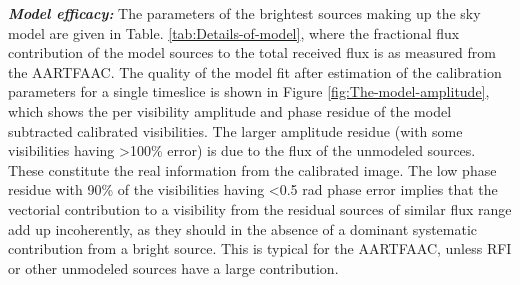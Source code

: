\documentclass{aa}
\begin{document}
\textbf{\emph{Model efficacy:  }}The parameters of the  brightest sources making
up  the sky  model are  given  in Table.  \ref{tab:Details-of-model}, where  the
fractional flux contribution of the model  sources to the total received flux is
as measured from the AARTFAAC. The  quality of the model fit after estimation of
the  calibration  parameters   for  a  single  timeslice  is   shown  in  Figure
\ref{fig:The-model-amplitude},  which  shows the  per  visibility amplitude  and
phase  residue  of the  model  subtracted  calibrated  visibilities. The  larger
amplitude residue  (with some  visibilities having >100\%  error) is due  to the
flux of  the unmodeled sources. These  constitute the real  information from the
calibrated image.  The low  phase residue with  90\% of the  visibilities having
<0.5 rad  phase error  implies that the  vectorial contribution to  a visibility
from the  residual sources of  similar flux range  add up incoherently,  as they
should  in the  absence  of a  dominant  systematic contribution  from a  bright
source. This is typical for the  AARTFAAC, unless RFI or other unmodeled sources
have a large contribution.
\end{document}
